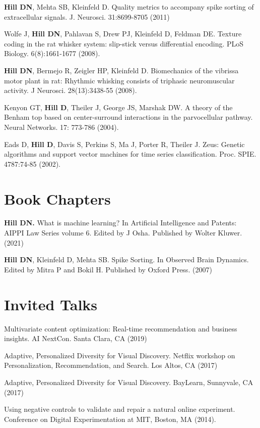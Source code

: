 \documentclass[line,11pt]{res}
\begin{document}
\begin{resume}
\textbf{Hill DN}, Mehta SB, Kleinfeld D.  Quality metrics to accompany spike sorting of extracellular signals. J. Neurosci. 31:8699-8705 (2011)

Wolfe J, \textbf{Hill DN}, Pahlavan S, Drew PJ, Kleinfeld D, Feldman DE. Texture coding in the rat whisker system: slip-stick versus differential encoding. PLoS Biology. 6(8):1661-1677 (2008). 

\textbf{Hill DN}, Bermejo R, Zeigler HP, Kleinfeld D. Biomechanics of the vibrissa motor plant in rat: Rhythmic whisking consists of triphasic neuromuscular activity. J Neurosci. 28(13):3438-55 (2008). 

Kenyon GT, \textbf{Hill D}, Theiler J, George JS, Marshak DW. A theory of the Benham top based on center-surround interactions in the parvocellular pathway. Neural Networks. 17: 773-786 (2004). 

Eads D, \textbf{Hill D}, Davis S, Perkins S, Ma J, Porter R, Theiler J. Zeus: Genetic algorithms and support vector machines for time series classification. Proc. SPIE. 4787:74-85 (2002).

\section{Book Chapters}
\vspace{0.1in}

\textbf{Hill DN.} What is machine learning? In Artificial Intelligence and Patents: AIPPI Law Series volume 6. Edited by J Osha. Published by Wolter Kluwer. (2021)

\textbf{Hill DN}, Kleinfeld D, Mehta SB. Spike Sorting. In Observed Brain Dynamics. Edited by Mitra P and Bokil H. Published by Oxford Press. (2007)

\section{Invited Talks}
\vspace{0.1in}

Multivariate content optimization: Real-time recommendation and business insights. AI NextCon. Santa Clara, CA (2019)

Adaptive, Personalized Diversity for Visual Discovery. Netflix workshop on Personalization, Recommendation, and Search. Los Altos, CA (2017)

Adaptive, Personalized Diversity for Visual Discovery. BayLearn, Sunnyvale, CA (2017)

Using negative controls to validate and repair a natural online experiment.  Conference on Digital Experimentation at MIT, Boston, MA (2014).


\end{resume}
\end{document}
